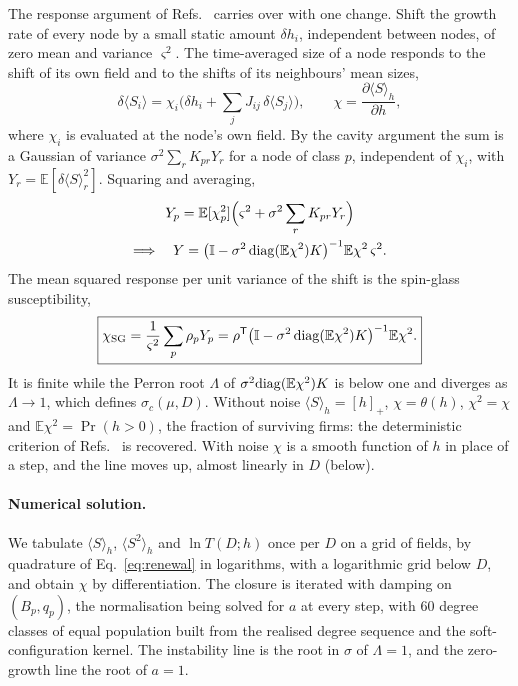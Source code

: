\documentclass[pre,twocolumn,superscriptaddress,nofootinbib]{revtex4-2}
\newcommand{\E}{\mathbb E}
\begin{document}
The response argument of Refs.~\cite{opperdiederich1992,bunin2017,aguirrelopez,patil2026} carries over with one change.  Shift the growth rate of every
node by a small static amount $\delta h_i$, independent between nodes, of zero mean and variance $\varsigma^2$.  The
time-averaged size of a node responds to the shift of its own field and to the shifts of its neighbours' mean
sizes,
\begin{equation}
\delta\langle S_i\rangle=\chi_i\Big(\delta h_i+\sum_jJ_{ij}\,\delta\langle S_j\rangle\Big),\qquad
\chi=\frac{\partial\langle S\rangle_h}{\partial h},
\end{equation}
where $\chi_i$ is evaluated at the node's own field.  By the cavity argument the sum is a Gaussian of variance
$\sigma^2\sum_rK_{pr}Y_r$ for a node of class $p$, independent of $\chi_i$, with $Y_r=\E[\delta\langle S\rangle_r^2]$.
Squaring and averaging,
\begin{equation}
\begin{gathered}
Y_p=\E[\chi_p^2]\Big(\varsigma^2+\sigma^2\sum_rK_{pr}Y_r\Big)\\
\Longrightarrow\quad Y=\big(\mathbb{I}-\sigma^2\,{\rm diag}(\E\chi^2)K\big)^{-1}\E\chi^2\,\varsigma^2 .
\end{gathered}
\end{equation}
The mean squared response per unit variance of the shift is the spin-glass susceptibility,
\begin{equation}
\boxed{\chi_{\rm SG}=\frac1{\varsigma^2}\sum_p\rho_pY_p=\rho^{\sf T}\big(\mathbb{I}-\sigma^2\,{\rm diag}(\E\chi^2)K\big)^{-1}\E\chi^2 .}
\label{eq:chisg}
\end{equation}
It is finite while the Perron root $\Lambda$ of $\sigma^2{\rm diag}(\E\chi^2)K$ is below one and diverges as
$\Lambda\to1$, which defines $\sigma_c(\mu,D)$.  Without noise $\langle S\rangle_h=[h]_+$, $\chi=\theta(h)$, $\chi^2=\chi$ and
$\E\chi^2=\Pr(h>0)$, the fraction of surviving firms: the deterministic criterion of Refs.~\cite{aguirrelopez,patil2026} is recovered.  With noise $\chi$ is a smooth function of $h$ in place of a step, and the line moves up, almost linearly in $D$ (below).

\paragraph{Numerical solution.}  We tabulate $\langle S\rangle_h$, $\langle S^2\rangle_h$ and $\ln T(D;h)$ once per $D$ on a grid of fields,
by quadrature of Eq.~\eqref{eq:renewal} in logarithms, with a logarithmic grid below $D$, and obtain $\chi$ by
differentiation.  The closure is iterated with damping on $(B_p,q_p)$, the normalisation being solved for $a$ at
every step, with $60$ degree classes of equal population built from the realised degree sequence and the
soft-configuration kernel.  The instability line is the root in $\sigma$ of $\Lambda=1$, and the zero-growth line the
root of $a=1$.
\end{document}
